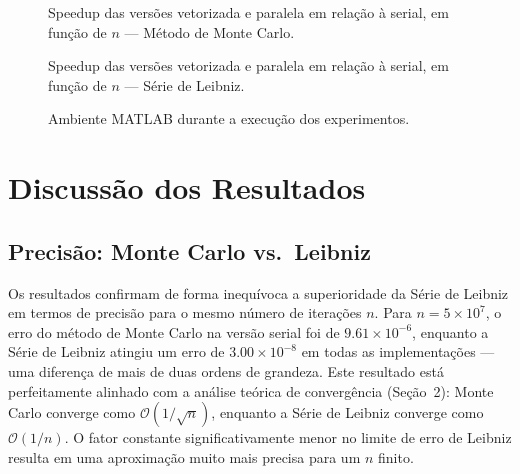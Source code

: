 \documentclass[12pt, a4paper]{article}
\begin{document}
	\begin{figure}[H]
		\centering
		\caption{Speedup das versões vetorizada e paralela em relação à serial,
			em função de $n$ — Método de Monte Carlo.}
		\label{fig:plot_mc}
	\end{figure}
	
	\begin{figure}[H]
		\centering
		\caption{Speedup das versões vetorizada e paralela em relação à serial,
			em função de $n$ — Série de Leibniz.}
		\label{fig:plot_lb}
	\end{figure}
	
	\begin{figure}[H]
		\centering
		\caption{Ambiente MATLAB durante a execução dos experimentos.}
		\label{fig:matlab_env}
	\end{figure}
	
	\section{Discussão dos Resultados}
	
	\subsection{Precisão: Monte Carlo vs.\ Leibniz}
	
	Os resultados confirmam de forma inequívoca a superioridade da Série de Leibniz
	em termos de precisão para o mesmo número de iterações \(n\). Para \(n = 5 \times 10^7\),
	o erro do método de Monte Carlo na versão serial foi de \(9.61\times10^{-6}\),
	enquanto a Série de Leibniz atingiu um erro de \(3.00\times10^{-8}\) em todas as
	implementações — uma diferença de mais de duas ordens de grandeza. Este resultado
	está perfeitamente alinhado com a análise teórica de convergência (Seção~2): Monte
	Carlo converge como \(\mathcal{O}(1/\sqrt{n})\), enquanto a Série de Leibniz
	converge como \(\mathcal{O}(1/n)\). O fator constante significativamente menor
	no limite de erro de Leibniz resulta em uma aproximação muito mais precisa para
	um \(n\) finito.
	
\end{document}
